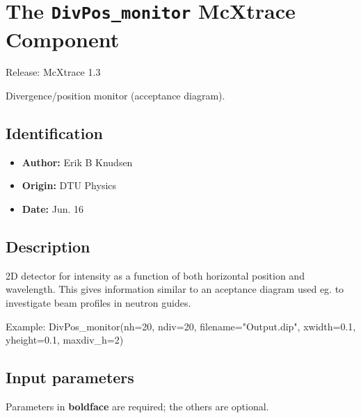 \section{The \texttt{DivPos\_monitor} McXtrace Component}
Release: McXtrace 1.3

Divergence/position monitor (acceptance diagram).

\subsection*{Identification}
\begin{itemize}
  \item \textbf{Author:} Erik B Knudsen
  \item \textbf{Origin:} DTU Physics
  \item \textbf{Date:} Jun. 16
\end{itemize}

\subsection*{Description}
2D detector for intensity as a function of both horizontal position and wavelength. This gives information similar to an aceptance diagram used eg. to investigate beam profiles in neutron guides.

Example: DivPos\_monitor(nh=20, ndiv=20, filename="Output.dip", xwidth=0.1, yheight=0.1, maxdiv\_h=2)

\subsection*{Input parameters}
Parameters in \textbf{boldface} are required; the others are optional.

